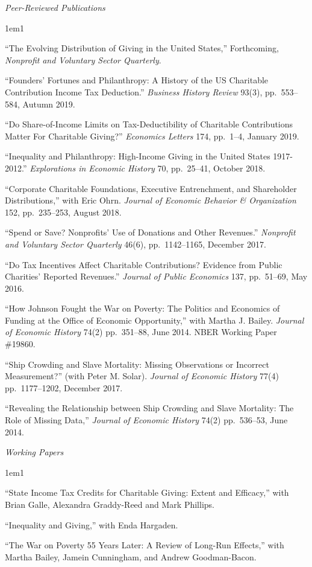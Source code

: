 \documentclass[12pt]{article}
\newcommand{\heading}[1]{
	{\setlength{\parskip}{0.8cm plus6mm minus3mm}
	\parindent=0pt
	\large \textit{{#1}}}
	\vspace{0.1em}
}
\newenvironment{paperlist}{
	\begin{hangparas}{1em}{1}
	\raggedright \setlength{\parindent}{.3em} \setlength{\parskip}{6pt}
}{
	\end{hangparas}
}
\begin{document}
\heading{Peer-Reviewed Publications}

\begin{paperlist}

``The Evolving Distribution of Giving in the United States,'' Forthcoming, \textit{Nonprofit} \textit{and Voluntary Sector Quarterly}.

``Founders' Fortunes and Philanthropy: A History of the US Charitable Contribution Income Tax Deduction.''   \textit{Business History Review} 93(3), pp.\ 553--584, Autumn 2019.

``Do Share-of-Income Limits on Tax-Deductibility of Charitable Contributions Matter For Charitable Giving?'' \textit{Economics Letters} 174, pp.\ 1--4, January 2019.

``Inequality and Philanthropy: High-Income Giving in the United States 1917-2012.''  \textit{Explorations in Economic History} 70, pp.\ 25--41, October 2018.

``Corporate Charitable Foundations, Executive Entrenchment, and Shareholder Distributions,'' with Eric Ohrn.  \textit{Journal of Economic Behavior \& Organization} 152, pp.\ 235--253, August 2018.

``Spend or Save? Nonprofits' Use of Donations and Other Revenues.'' \textit{Nonprofit and Voluntary Sector Quarterly}  46(6), pp.\ 1142--1165, December 2017.

``Do Tax Incentives Affect Charitable Contributions? Evidence from Public Charities' Reported Revenues.'' \textit{Journal of Public Economics} 137, pp.\ 51--69, May 2016.

``How Johnson Fought the War on Poverty: The Politics and Economics of Funding at the Office of Economic Opportunity,'' with Martha J. Bailey. \textit{Journal of Economic History} 74(2) pp.\ 351--88, June 2014.  NBER Working Paper \#19860.

``Ship Crowding and Slave Mortality: Missing Observations or Incorrect Measurement?'' (with Peter M. Solar). \textit{Journal of Economic History} 77(4) pp.\ 1177--1202, December 2017.

``Revealing the Relationship between Ship Crowding and Slave Mortality: The Role of Missing Data,'' \textit{Journal of Economic History} 74(2) pp.\ 536--53, June 2014. 

\end{paperlist}


\heading{Working Papers}

\begin{paperlist}



``State Income Tax Credits for Charitable Giving: Extent and Efficacy,'' with Brian Galle, Alexandra Graddy-Reed and Mark Phillips. 

``Inequality and Giving,'' with Enda Hargaden. 

``The War on Poverty 55 Years Later: A Review of Long-Run Effects,'' with Martha Bailey, Jamein Cunningham, and Andrew Goodman-Bacon.


\end{paperlist}
\end{document}
